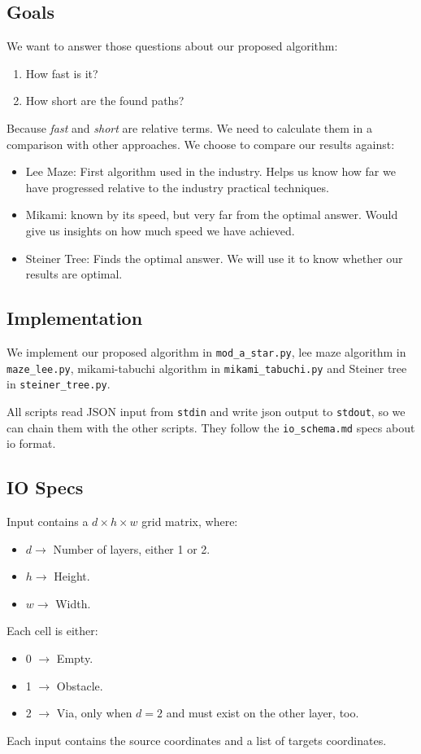 \subsection{Goals}
We want to answer those questions about our proposed algorithm:
\begin{enumerate}
    \item How fast is it?
    \item How short are the found paths?
\end{enumerate}
Because \textit{fast} and \textit{short} are relative terms. We need to calculate them in a comparison with other approaches. 
We choose to compare our results against:
\begin{itemize}
    \item Lee Maze: First algorithm used in the industry. Helps us know how far we have progressed relative to the industry practical techniques.
    \item Mikami: known by its speed, but very far from the optimal answer. Would give us insights on how much speed we have achieved.
    \item Steiner Tree: Finds the optimal answer. We will use it to know whether our results are optimal.
\end{itemize}

\subsection{Implementation}
We implement our proposed algorithm in \texttt{mod\_a\_star.py}, 
lee maze algorithm in \texttt{maze\_lee.py},
mikami-tabuchi algorithm in \texttt{mikami\_tabuchi.py}
and Steiner tree in \texttt{steiner\_tree.py}.

All scripts read JSON input from \texttt{stdin} and write json output to \texttt{stdout}, so we can chain them with the other scripts. They follow the \texttt{io\_schema.md} specs about io format.

\subsection{IO Specs}
Input contains a $d\times h \times w$ grid matrix, where:
\begin{itemize}
    \item $d \rightarrow$ Number of layers, either 1 or 2.
    \item $h \rightarrow$ Height.
    \item $w \rightarrow$ Width.
\end{itemize}
Each cell is either:
\begin{itemize}
    \item 0 $\rightarrow$ Empty.
    \item 1 $\rightarrow$ Obstacle.
    \item 2 $\rightarrow$ Via, only when $d=2$ and must exist on the other layer, too.
\end{itemize}
Each input contains the source coordinates and a list of targets coordinates.

